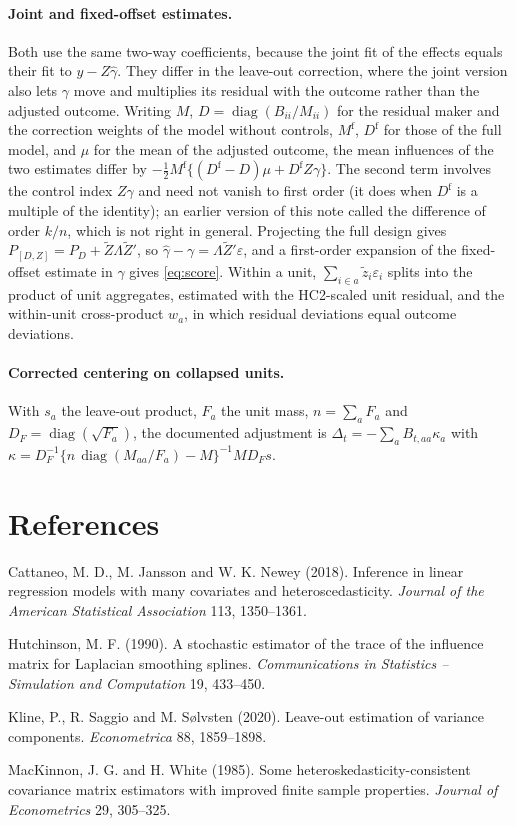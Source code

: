 \documentclass[11pt]{article}
\newcommand{\diag}{\operatorname{diag}}
\begin{document}
\paragraph{Joint and fixed-offset estimates.} Both use the same two-way
coefficients, because the joint fit of the effects equals their fit to
$y-Z\hat\gamma$. They differ in the leave-out correction, where the joint
version also lets $\gamma$ move and multiplies its residual with the outcome
rather than the adjusted outcome. Writing $M$, $D=\diag(B_{ii}/M_{ii})$ for
the residual maker and the correction weights of the model without controls,
$M^{\mathrm f}$, $D^{\mathrm f}$ for those of the full model, and $\mu$ for
the mean of the adjusted outcome, the mean influences of the two estimates
differ by $-\tfrac12M^{\mathrm f}\{(D^{\mathrm f}-D)\mu+D^{\mathrm f}Z\gamma\}$.
The second term involves the control index $Z\gamma$ and need not vanish to
first order (it does when $D^{\mathrm f}$ is a multiple of the identity); an
earlier version of this note called the difference of order $k/n$, which is
not right in general. Projecting the full design gives
$P_{[D,Z]}=P_D+\tilde Z\Lambda\tilde Z'$, so $\hat\gamma-\gamma=
\Lambda\tilde Z'\varepsilon$, and a first-order expansion of the fixed-offset
estimate in $\gamma$ gives \eqref{eq:score}. Within a unit,
$\sum_{i\in a}\tilde z_i\varepsilon_i$ splits into the product of unit
aggregates, estimated with the HC2-scaled unit residual, and the within-unit
cross-product $w_a$, in which residual deviations equal outcome deviations.

\paragraph{Corrected centering on collapsed units.} With $s_a$ the leave-out
product, $F_a$ the unit mass, $n=\sum_aF_a$ and
$D_F=\diag(\sqrt{F_a})$, the documented adjustment is
$\Delta_t=-\sum_aB_{t,aa}\kappa_a$ with
$\kappa=D_F^{-1}\{n\,\diag(M_{aa}/F_a)-M\}^{-1}MD_Fs$.

\section*{References}
\begin{description}[leftmargin=1.5em,labelindent=0em,itemsep=2pt]
\item Cattaneo, M. D., M. Jansson and W. K. Newey (2018). Inference in linear
regression models with many covariates and heteroscedasticity. \emph{Journal
of the American Statistical Association} 113, 1350--1361.
\item Hutchinson, M. F. (1990). A stochastic estimator of the trace of the
influence matrix for Laplacian smoothing splines. \emph{Communications in
Statistics -- Simulation and Computation} 19, 433--450.
\item Kline, P., R. Saggio and M. S{\o}lvsten (2020). Leave-out estimation of
variance components. \emph{Econometrica} 88, 1859--1898.
\item MacKinnon, J. G. and H. White (1985). Some heteroskedasticity-consistent
covariance matrix estimators with improved finite sample properties.
\emph{Journal of Econometrics} 29, 305--325.
\end{description}
\end{document}

